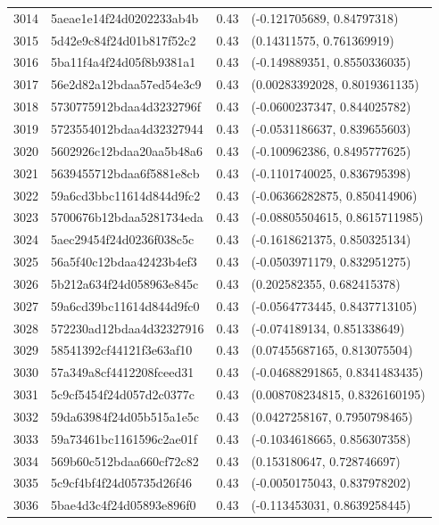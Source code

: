 \begin{table}[ht]
\begin{tabular}{rlrl}
  3014 & 5aeae1e14f24d0202233ab4b & 0.43 & (-0.121705689, 0.84797318) \\ 
  3015 & 5d42e9c84f24d01b817f52c2 & 0.43 & (0.14311575, 0.761369919) \\ 
  3016 & 5ba11f4a4f24d05f8b9381a1 & 0.43 & (-0.149889351, 0.8550336035) \\ 
  3017 & 56e2d82a12bdaa57ed54e3c9 & 0.43 & (0.00283392028, 0.8019361135) \\ 
  3018 & 5730775912bdaa4d3232796f & 0.43 & (-0.0600237347, 0.844025782) \\ 
  3019 & 5723554012bdaa4d32327944 & 0.43 & (-0.0531186637, 0.839655603) \\ 
  3020 & 5602926c12bdaa20aa5b48a6 & 0.43 & (-0.100962386, 0.8495777625) \\ 
  3021 & 5639455712bdaa6f5881e8cb & 0.43 & (-0.1101740025, 0.836795398) \\ 
  3022 & 59a6cd3bbc11614d844d9fc2 & 0.43 & (-0.06366282875, 0.850414906) \\ 
  3023 & 5700676b12bdaa5281734eda & 0.43 & (-0.08805504615, 0.8615711985) \\ 
  3024 & 5aec29454f24d0236f038c5c & 0.43 & (-0.1618621375, 0.850325134) \\ 
  3025 & 56a5f40c12bdaa42423b4ef3 & 0.43 & (-0.0503971179, 0.832951275) \\ 
  3026 & 5b212a634f24d058963e845c & 0.43 & (0.202582355, 0.682415378) \\ 
  3027 & 59a6cd39bc11614d844d9fc0 & 0.43 & (-0.0564773445, 0.8437713105) \\ 
  3028 & 572230ad12bdaa4d32327916 & 0.43 & (-0.074189134, 0.851338649) \\ 
  3029 & 58541392cf44121f3e63af10 & 0.43 & (0.07455687165, 0.813075504) \\ 
  3030 & 57a349a8cf4412208fceed31 & 0.43 & (-0.04688291865, 0.8341483435) \\ 
  3031 & 5c9cf5454f24d057d2c0377c & 0.43 & (0.008708234815, 0.8326160195) \\ 
  3032 & 59da63984f24d05b515a1e5c & 0.43 & (0.0427258167, 0.7950798465) \\ 
  3033 & 59a73461bc1161596c2ae01f & 0.43 & (-0.1034618665, 0.856307358) \\ 
  3034 & 569b60c512bdaa660cf72c82 & 0.43 & (0.153180647, 0.728746697) \\ 
  3035 & 5c9cf4bf4f24d05735d26f46 & 0.43 & (-0.0050175043, 0.837978202) \\ 
  3036 & 5bae4d3c4f24d05893e896f0 & 0.43 & (-0.113453031, 0.8639258445) \\ 

\end{tabular}
\end{table}
